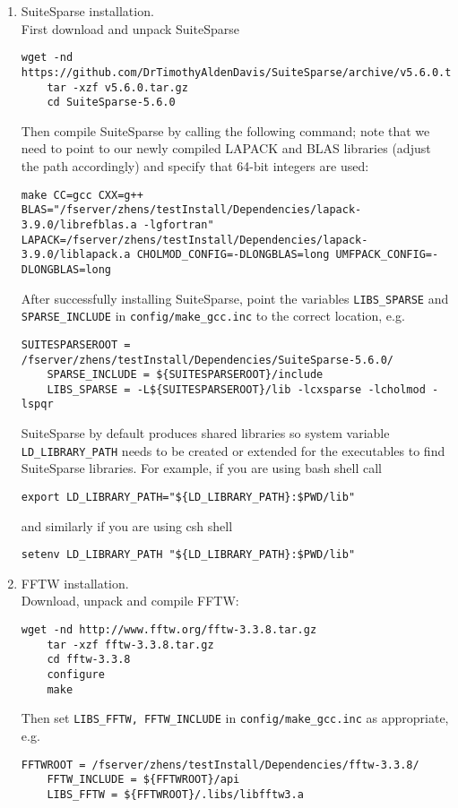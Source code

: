 \documentclass[english,11pt]{article}
\begin{document}
\begin{enumerate}
    \item SuiteSparse installation.\\
    First download and unpack SuiteSparse
    \begin{lstlisting}[breaklines=true, showstringspaces=false]
    wget -nd https://github.com/DrTimothyAldenDavis/SuiteSparse/archive/v5.6.0.tar.gz
    tar -xzf v5.6.0.tar.gz
    cd SuiteSparse-5.6.0
    \end{lstlisting}
    Then compile SuiteSparse by calling the following command; note that we need to point to our newly compiled LAPACK and BLAS libraries (adjust the path accordingly) and specify that 64-bit integers are used:
    \begin{lstlisting}[breaklines=true, showstringspaces=false]
    make CC=gcc CXX=g++ BLAS="/fserver/zhens/testInstall/Dependencies/lapack-3.9.0/librefblas.a -lgfortran" LAPACK=/fserver/zhens/testInstall/Dependencies/lapack-3.9.0/liblapack.a CHOLMOD_CONFIG=-DLONGBLAS=long UMFPACK_CONFIG=-DLONGBLAS=long 
    \end{lstlisting}
    After successfully installing SuiteSparse, point the variables {\tt LIBS_SPARSE} and {\tt SPARSE_INCLUDE} in {\tt config/make_gcc.inc} to the correct location, e.g. 
    \begin{lstlisting}[breaklines=true, showstringspaces=false]
    SUITESPARSEROOT = /fserver/zhens/testInstall/Dependencies/SuiteSparse-5.6.0/
    SPARSE_INCLUDE = ${SUITESPARSEROOT}/include
    LIBS_SPARSE = -L${SUITESPARSEROOT}/lib -lcxsparse -lcholmod -lspqr
    \end{lstlisting}
    SuiteSparse by default produces shared libraries so system variable {\tt LD_LIBRARY_PATH} needs to be created or extended for the executables to find SuiteSparse libraries. For example, if you are using bash shell call
    \begin{lstlisting}[breaklines=true, showstringspaces=false]
    export LD_LIBRARY_PATH="${LD_LIBRARY_PATH}:$PWD/lib"
    \end{lstlisting}
    and similarly if you are using csh shell
    \begin{lstlisting}[breaklines=true, showstringspaces=false]
    setenv LD_LIBRARY_PATH "${LD_LIBRARY_PATH}:$PWD/lib" 
    \end{lstlisting}
    
    \item FFTW installation.\\
    Download, unpack and compile FFTW:
    \begin{lstlisting}[breaklines=true, showstringspaces=false]
    wget -nd http://www.fftw.org/fftw-3.3.8.tar.gz
    tar -xzf fftw-3.3.8.tar.gz
    cd fftw-3.3.8
    configure
    make
    \end{lstlisting}
    Then set {\tt LIBS_FFTW, FFTW_INCLUDE} in {\tt config/make_gcc.inc} as appropriate, e.g. 
    \begin{lstlisting}[breaklines=true, showstringspaces=false]
    FFTWROOT = /fserver/zhens/testInstall/Dependencies/fftw-3.3.8/
    FFTW_INCLUDE = ${FFTWROOT}/api
    LIBS_FFTW = ${FFTWROOT}/.libs/libfftw3.a
    \end{lstlisting}
    

\end{enumerate}
\end{document}

